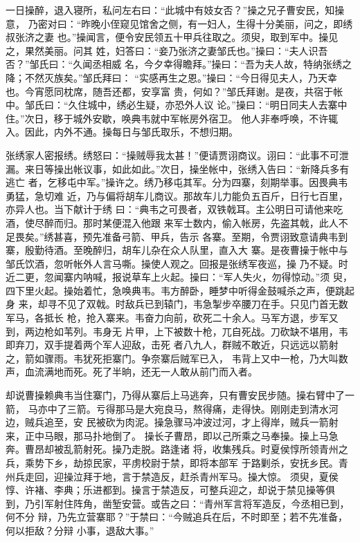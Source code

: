 一日操醉，退入寝所，私问左右曰：“此城中有妓女否？”操之兄子曹安民，知操意，
乃密对曰：“昨晚小侄窥见馆舍之侧，有一妇人，生得十分美丽，问之，即绣叔张济之妻
也。”操闻言，便令安民领五十甲兵往取之。须臾，取到军中。操见之，果然美丽。问其
姓，妇答曰：“妾乃张济之妻邹氏也。”操曰：“夫人识吾否？”邹氏曰：“久闻丞相威
名，今夕幸得瞻拜。”操曰：“吾为夫人故，特纳张绣之降；不然灭族矣。”邹氏拜曰：
“实感再生之恩。”操曰：“今日得见夫人，乃天幸也。今宵愿同枕席，随吾还都，安享富
贵，何如？”邹氏拜谢。是夜，共宿于帐中。邹氏曰：“久住城中，绣必生疑，亦恐外人议
论。”操曰：“明日同夫人去寨中住。”次日，移于城外安歇，唤典韦就中军帐房外宿卫。
他人非奉呼唤，不许辄入。因此，内外不通。操每日与邹氏取乐，不想归期。

张绣家人密报绣。绣怒曰：“操贼辱我太甚！”便请贾诩商议。诩曰：“此事不可泄
漏。来日等操出帐议事，如此如此。”次日，操坐帐中，张绣入告曰：“新降兵多有逃亡
者，乞移屯中军。”操许之。绣乃移屯其军。分为四寨，刻期举事。因畏典韦勇猛，急切难
近，乃与偏将胡车儿商议。那故车儿力能负五百斤，日行七百里，亦异人也。当下献计于绣
曰：“典韦之可畏者，双铁戟耳。主公明日可请他来吃酒，使尽醉而归。那时某便混入他跟
来军士数内，偷入帐房，先盗其戟，此人不足畏矣。”绣甚喜，预先准备弓箭、甲兵，告示
各寨。至期，令贾诩致意请典韦到寨，殷勤待酒。至晚醉归，胡车儿杂在众人队里，直入大
寨。是夜曹操于帐中与邹氏饮酒，忽听帐外人言马嘶。操使人观之。回报是张绣军夜巡，操
乃不疑。时近二更，忽闻寨内呐喊，报说草车上火起。操曰：“军人失火，勿得惊动。”须
臾，四下里火起。操始着忙，急唤典韦。韦方醉卧，睡梦中听得金鼓喊杀之声，便跳起身
来，却寻不见了双戟。时敌兵已到辕门，韦急掣步卒腰刀在手。只见门首无数军马，各抵长
枪，抢入寨来。韦奋力向前，砍死二十余人。马军方退，步军又到，两边枪如苇列。韦身无
片甲，上下被数十枪，兀自死战。刀砍缺不堪用，韦即弃刀，双手提着两个军人迎敌，击死
者八九人，群贼不敢近，只远远以箭射之，箭如骤雨。韦犹死拒寨门。争奈寨后贼军已入，
韦背上又中一枪，乃大叫数声，血流满地而死。死了半晌，还无一人敢从前门而入者。

却说曹操赖典韦当住寨门，乃得从寨后上马逃奔，只有曹安民步随。操右臂中了一箭，
马亦中了三箭。亏得那马是大宛良马，熬得痛，走得快。刚刚走到清水河边，贼兵追至，安
民被砍为肉泥。操急骤马冲波过河，才上得岸，贼兵一箭射来，正中马眼，那马扑地倒了。
操长子曹昂，即以己所乘之马奉操。操上马急奔。曹昂却被乱箭射死。操乃走脱。路逢诸
将，收集残兵。时夏侯惇所领青州之兵，乘势下乡，劫掠民家，平虏校尉于禁，即将本部军
于路剿杀，安抚乡民。青州兵走回，迎操泣拜于地，言于禁造反，赶杀青州军马。操大惊。
须臾，夏侯惇、许褚、李典；乐进都到。操言于禁造反，可整兵迎之，却说于禁见操等俱
到，乃引军射住阵角，凿堑安营。或告之曰：“青州军言将军造反，今丞相已到，何不分
辩，乃先立营寨耶？”于禁曰：“今贼追兵在后，不时即至；若不先准备，何以拒敌？分辩
小事，退敌大事。”

